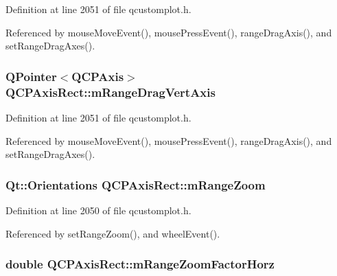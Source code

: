 Definition at line 2051 of file qcustomplot.\+h.



Referenced by mouse\+Move\+Event(), mouse\+Press\+Event(), range\+Drag\+Axis(), and set\+Range\+Drag\+Axes().

\hypertarget{class_q_c_p_axis_rect_a3e41dffec18987366f2a8ffd80689c12}{}
\subsubsection[{m\+Range\+Drag\+Vert\+Axis}]{\setlength{\rightskip}{0pt plus 5cm}Q\+Pointer$<${\bf Q\+C\+P\+Axis}$>$ Q\+C\+P\+Axis\+Rect\+::m\+Range\+Drag\+Vert\+Axis\hspace{0.3cm}{\ttfamily [protected]}}\label{class_q_c_p_axis_rect_a3e41dffec18987366f2a8ffd80689c12}


Definition at line 2051 of file qcustomplot.\+h.



Referenced by mouse\+Move\+Event(), mouse\+Press\+Event(), range\+Drag\+Axis(), and set\+Range\+Drag\+Axes().

\hypertarget{class_q_c_p_axis_rect_a215eff671d48df2edccc36e7f976f28c}{}
\subsubsection[{m\+Range\+Zoom}]{\setlength{\rightskip}{0pt plus 5cm}Qt\+::\+Orientations Q\+C\+P\+Axis\+Rect\+::m\+Range\+Zoom\hspace{0.3cm}{\ttfamily [protected]}}\label{class_q_c_p_axis_rect_a215eff671d48df2edccc36e7f976f28c}


Definition at line 2050 of file qcustomplot.\+h.



Referenced by set\+Range\+Zoom(), and wheel\+Event().

\hypertarget{class_q_c_p_axis_rect_ad08d0250ed7b99de387d0ea6c7fd4dc1}{}
\subsubsection[{m\+Range\+Zoom\+Factor\+Horz}]{\setlength{\rightskip}{0pt plus 5cm}double Q\+C\+P\+Axis\+Rect\+::m\+Range\+Zoom\+Factor\+Horz\hspace{0.3cm}{\ttfamily [protected]}}\label{class_q_c_p_axis_rect_ad08d0250ed7b99de387d0ea6c7fd4dc1}


